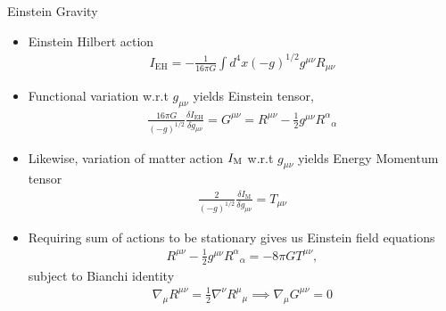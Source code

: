 \documentclass[8pt,aspectratio=1610]{beamer}
\begin{document}

\begin{frame}{Einstein Gravity}
	\begin{itemize}
		\item 	Einstein Hilbert action
		\begin{eqnarray}
		I_{\text{EH}} = -\frac{1}{16\pi G} \int d^4x (-g)^{1/2}  g^{\mu\nu}R_{\mu\nu}
		\end{eqnarray}
		\item 	Functional variation w.r.t $g_{\mu\nu}$ yields Einstein tensor,
		\begin{eqnarray}
		\frac{16\pi G}{(-g)^{1/2}} \frac{\delta I_{\text{EH}}}{\delta g_{\mu\nu}}= G^{\mu\nu} = R^{\mu\nu} - \frac{1}{2}g^{\mu\nu}R^\alpha{}_\alpha
		\end{eqnarray}
		\item 	Likewise, variation of matter action $I_{\rm M}$ w.r.t $g_{\mu\nu}$ yields Energy Momentum tensor
		\begin{eqnarray}
		\frac{2}{(-g)^{1/2}} \frac{ \delta I_\text{M}}{\delta g_{\mu\nu}} = T_{\mu\nu}
		\end{eqnarray}
		\item 	Requiring sum of actions to be stationary gives us Einstein field equations
		\begin{eqnarray}
		R^{\mu\nu} - \frac{1}{2}g^{\mu\nu}R^\alpha{}_\alpha = -8\pi G T^{\mu\nu},
		\label{EinEOM}
		\end{eqnarray}
		subject to Bianchi identity
		\begin{eqnarray}
		\nabla_\mu R^{\mu\nu} = \frac{1}{2}\nabla^\nu R^\mu{}_\mu \implies \nabla_\mu G^{\mu\nu} = 0
		\end{eqnarray}
	\end{itemize}
\end{frame}

\end{document}
